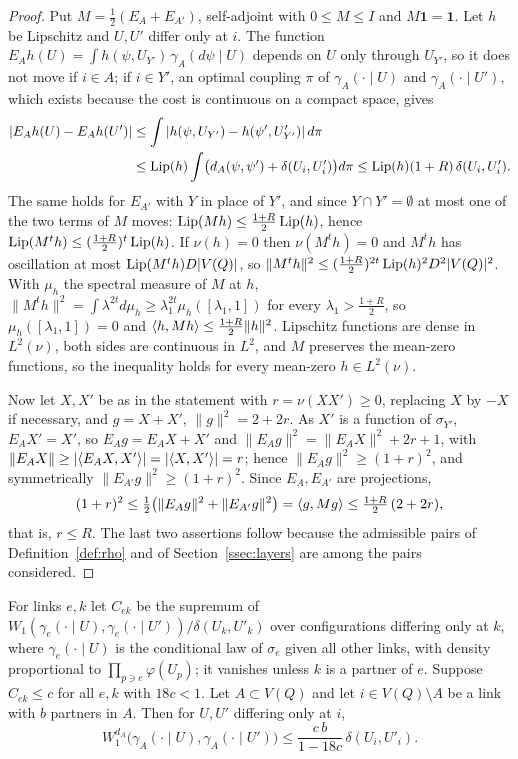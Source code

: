 \begin{proof}
Put $M=\frac12(E_A+E_{A'})$, self-adjoint with $0\le M\le I$ and $M\mathbf1=
\mathbf1$. Let $h$ be Lipschitz and $U,U'$ differ only at $i$. The function
$E_Ah(U)=\int h(\psi,U_{Y'})\,\gamma_A(d\psi\mid U)$ depends on $U$ only
through $U_{Y'}$, so it does not move if $i\in A$; if $i\in Y'$, an optimal
coupling $\pi$ of $\gamma_A(\cdot\mid U)$ and $\gamma_A(\cdot\mid U')$, which
exists because the cost is continuous on a compact space, gives
\begin{align*}
|E_Ah(U)-E_Ah(U')|&\le\int|h(\psi,U_{Y'})-h(\psi',U'_{Y'})|\,d\pi\\
&\le\operatorname{Lip}(h)\int\bigl(d_A(\psi,\psi')+\delta(U_i,U'_i)\bigr)d\pi\le
\operatorname{Lip}(h)(1+R)\,\delta(U_i,U'_i).
\end{align*}
The same holds for $E_{A'}$ with $Y$ in place of $Y'$, and since $Y\cap
Y'=\emptyset$ at most one of the two terms of $M$ moves: $\operatorname{Lip}(Mh)\le
\frac{1+R}2\operatorname{Lip}(h)$, hence $\operatorname{Lip}(M^th)\le(\frac{1+R}2)^t\operatorname{Lip}(h)$. If
$\nu(h)=0$ then $\nu(M^th)=0$ and $M^th$ has oscillation at most
$\operatorname{Lip}(M^th)D|V(Q)|$, so $\|M^th\|^2\le(\frac{1+R}2)^{2t}\operatorname{Lip}(h)^2D^2|V(Q)|^2$.
With $\mu_h$ the spectral measure of $M$ at $h$, $\|M^th\|^2=\int\lambda^{2t}
d\mu_h\ge\lambda_1^{2t}\mu_h([\lambda_1,1])$ for every $\lambda_1>\frac{1+R}2$,
so $\mu_h([\lambda_1,1])=0$ and $\langle h,Mh\rangle\le\frac{1+R}2\|h\|^2$. Lipschitz
functions are dense in $L^2(\nu)$, both sides are continuous in $L^2$, and
$M$ preserves the mean-zero functions, so the inequality holds for every
mean-zero $h\in L^2(\nu)$.

Now let $X,X'$ be as in the statement with $r=\nu(XX')\ge0$, replacing $X$
by $-X$ if necessary, and $g=X+X'$, $\|g\|^2=2+2r$. As $X'$ is a function of
$\sigma_{Y'}$, $E_AX'=X'$, so $E_Ag=E_AX+X'$ and $\|E_Ag\|^2=\|E_AX\|^2+2r+1$,
with $\|E_AX\|\ge|\langle E_AX,X'\rangle|=|\langle X,X'\rangle|=r$; hence $\|E_Ag\|^2\ge(1+r)^2$,
and symmetrically $\|E_{A'}g\|^2\ge(1+r)^2$. Since $E_A,E_{A'}$ are
projections,
\[
(1+r)^2\le\tfrac12\bigl(\|E_Ag\|^2+\|E_{A'}g\|^2\bigr)=\langle g,Mg\rangle\le
\tfrac{1+R}2\,(2+2r),
\]
that is, $r\le R$. The last two assertions follow because the admissible pairs of
Definition~\ref{def:rho} and of Section~\ref{ssec:layers} are among the pairs
considered.
\end{proof}

\begin{lemma}\label{lem:blockresponse}
For links $e,k$ let $C_{ek}$ be the supremum of $W_1(\gamma_e(\cdot\mid U),
\gamma_e(\cdot\mid U'))/\delta(U_k,U'_k)$ over configurations differing only
at $k$, where $\gamma_e(\cdot\mid U)$ is the conditional law of $\sigma_e$
given all other links, with density proportional to $\prod_{p\ni e}
\varphi(U_p)$; it vanishes unless $k$ is a partner of $e$. Suppose
$C_{ek}\le c$ for all $e,k$ with $18c<1$. Let $A\subset V(Q)$ and let $i\in
V(Q)\setminus A$ be a link with $b$ partners in $A$. Then for $U,U'$
differing only at $i$,
\[
W_1^{d_A}\bigl(\gamma_A(\cdot\mid U),\gamma_A(\cdot\mid U')\bigr)\le
\frac{c\,b}{1-18c}\,\delta(U_i,U'_i).
\]
\end{lemma}

